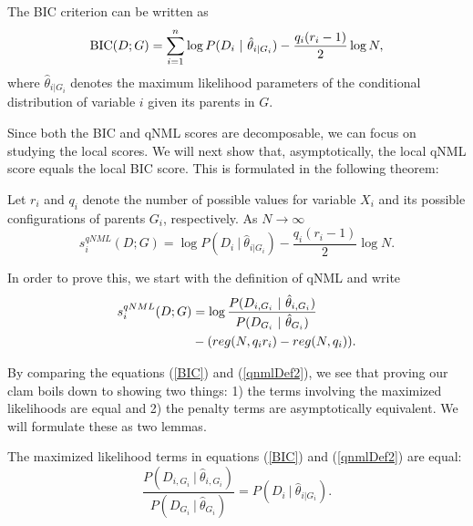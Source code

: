 The BIC criterion can be written as
\begin{equation}\label{BIC}
\textnormal{BIC}(D;G) = \sum_{i = 1}^n \log P(D_i \ | \ \hat{\theta}_{i | G_i} ) - \frac{q_i(r_i - 1)}{2} \log N,
\end{equation}
where $\hat{\theta}_{i | G_i}$ denotes the maximum likelihood parameters of
the conditional distribution of variable $i$ given its parents in
$G$. 

Since both the BIC and qNML scores are decomposable, we can focus on
studying the local scores. We will next show that, asymptotically, the
local qNML score equals the local BIC score. This is formulated in the
following theorem:

\begin{theorem}\label{consistency}
Let $r_i$ and $q_i$ denote the number of possible values for variable
$X_i$ and its possible configurations of parents $G_i$,
respectively. As $N \to \infty$
$$
s^{qNML}_i(D;G) =  \log P(D_i \ | \ \hat{\theta}_{i | G_i} )  - \frac{q_i(r_i - 1)}{2} \log N.
$$
\end{theorem}

In order to prove this, we start with the definition of qNML and write
\begin{align}\label{qnmlDef2}
s^{qNML}_i(D;G) &= \log \frac{P(D_{i, G_i} \ | \ \hat{\theta}_{i, G_i}
  )}{P(D_{G_i} \ | \ \hat{\theta}_{G_i} )} \notag \\ & -(reg(N,q_i
r_i) - reg(N,q_i)).
\end{align}

By comparing the equations (\ref{BIC}) and (\ref{qnmlDef2}), we see
that proving our clam boils down to showing two things: 1) the terms
involving the maximized likelihoods are equal and 2) the penalty terms
are asymptotically equivalent. We will formulate these as two
lemmas.

\begin{lemma}\label{MLLemma} The maximized likelihood terms in equations (\ref{BIC}) and (\ref{qnmlDef2}) are equal:    
$$
\frac{P(D_{i, G_i} \ | \ \hat{\theta}_{i, G_i} )}{P(D_{G_i} \ | \ \hat{\theta}_{G_i} )} = P(D_i \ | \ \hat{\theta}_{i | G_i} ).
$$
\end{lemma}

